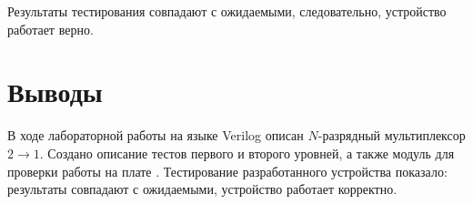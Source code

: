 Результаты тестирования совпадают с ожидаемыми, следовательно, устройство работает верно.
 
\section{Выводы}

В ходе лабораторной работы на языке Verilog описан $N$-разрядный мультиплексор $2 \rightarrow 1$. Создано описание тестов первого и второго уровней, а также модуль для проверки работы на плате . Тестирование разработанного устройства показало: результаты совпадают с ожидаемыми, устройство работает корректно.

